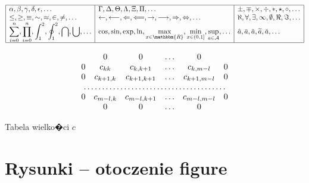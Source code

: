 \documentclass[11pt,wide]{mwart}
\begin{document}
%
%
\renewcommand{\arraystretch}{2}

$$
\begin{array}{*{3}{|l}|}\hline
\displaystyle
\alpha, \beta, \gamma, \delta, \epsilon, \ldots &
\displaystyle
\Gamma, \Delta, \Theta, \Lambda, \Xi, \Pi, \ldots &
\displaystyle
\pm, \mp, \times, \div, \ast, \star, \circ, \ldots\\
\displaystyle
\leq, \geq, \equiv, \sim, \approx, \in, \neq, \ldots &
\displaystyle
\leftarrow, \longleftarrow, \Leftarrow, \Longleftarrow,
\rightarrow, \longrightarrow, \Rightarrow, \Leftrightarrow, \ldots &
\displaystyle
\aleph, \forall, \exists, \infty, \emptyset, \Re, \Im,\ldots\\
\displaystyle
\sum_{i=0}^{n}, \prod_{i=0}^{n}, \int_{1}^{2}, \oint_{1}^{2}, \bigcap,
\bigcup,\ldots &
\displaystyle
\cos, \sin, \exp, \ln, \max_{x\in\mathbbm{R}}, \min_{x\in(0,1]},
\sup_{a\in\cal A}, \ldots &
\displaystyle
\hat{a}, \bar{a}, \tilde{a}, \widetilde{a}, \breve{a}, \ldots\\
\hline
\end{array}
$$

\renewcommand{\arraystretch}{1}

\begin{table}[h]
\[
\begin{array}{cccccc}
    &0&0&\ldots&0& \\
    0& c_{kk}&c_{k,k+1}&\ldots&c_{k,m-l}&0     \\
    0& c_{k+1,k}&c_{k+1,k+1}&\ldots&c_{k+1,m-l}&0  \\
    \multicolumn{6}{c}{\dotfill}\\    0& c_{m-l,k}&c_{m-l,k+1}&\ldots&c_{m-l,m-l}&0  \\
     &0&0&\ldots&0&
\end{array}
\]	
\caption{Tabela wielko�ci $c$ \label{Tab:C}}
\end{table}


\newpage

\section{Rysunki -- otoczenie figure}
\end{document}
